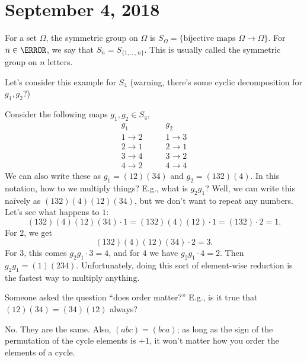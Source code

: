 \section{September 4, 2018}

\begin{definition}
For a set $\Omega$, the symmetric group on $\Omega$ is $S_\Omega = \{\text{bijective maps $\Omega \to \Omega$}\}$. For $n \in \N$, we say that $S_n = S_{\{1,\dotsc,n\}}$. This is usually called the symmetric group on $n$ letters.
\end{definition}

Let's consider this example for $S_4$ (warning, there's some cyclic decomposition for $g_1, g_2$?)

\begin{example}
Consider the following maps $g_1, g_2 \in S_4$,
\[
	\begin{array}{c}
	g_1 \\
	1 \to 2 \\
	2 \to 1 \\
	3 \to 4 \\
	4 \to 2
	\end{array} \qquad
	\begin{array}{c}
	g_2 \\
	1 \to 3 \\
	2 \to 1 \\
	3 \to 2 \\
	4 \to 4
	\end{array}
\]
We can also write these as $g_1 = (12)(34)$ and $g_2 = (132)(4)$. In this notation, how to we multiply things? E.g., what is $g_2g_1$? Well, we can write this naïvely as $(132)(4)(12)(34)$, but we don't want to repeat any numbers. Let's see what happens to $1$:
\[ (132)(4)(12)(34) \cdot 1 = (132)(4)(12) \cdot 1 = (132) \cdot 2 = 1. \] For $2$, we get 
\[ (132)(4)(12)(34) \cdot 2 = 3. \] For $3$, this comes $g_2g_1 \cdot 3 = 4$, and for $4$ we have $g_2g_1 \cdot 4 = 2$. Then $g_2g_1 = (1)(234)$. Unfortunately, doing this sort of element-wise reduction is the fastest way to multiply anything.
\end{example}

\begin{problem}
Someone asked the question ``does order matter?'' E.g., is it true that $(12)(34) = (34)(12)$ always?
\end{problem}
\begin{solution}
No. They are the same. Also, $(abc) = (bca)$; as long as the sign of the permutation of the cycle elements is $+1$, it won't matter how you order the elements of a cycle.
\end{solution}

